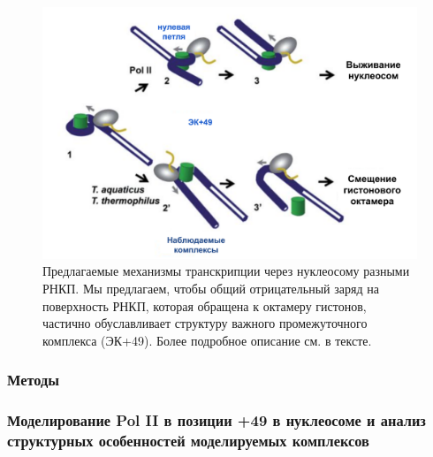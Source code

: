 \begin{figure} [H]
    \centering
    \includegraphics[width=\textwidth]{images/p6/p6_2/p6_2_nar2014_f7.pdf}
    \caption[Предлагаемые механизмы транскрипции через нуклеосому разными РНКП.]{Предлагаемые механизмы транскрипции через нуклеосому разными РНКП. Мы предлагаем, чтобы общий отрицательный заряд на поверхность РНКП, которая обращена к октамеру гистонов, частично обуславливает структуру важного промежуточного комплекса (ЭК+49). Более подробное описание см. в тексте.}
    \label{fig:p6_2_n2014_f7}
\end{figure}
    
    
    
    
    
    
    
    
    
    
\subsubsection{Методы}
\subsubsection{Моделирование Pol II в позиции +49 в нуклеосоме и анализ структурных особенностей моделируемых комплексов}
    

